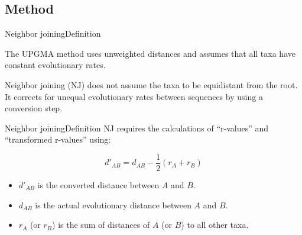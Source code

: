 \documentclass[10pt]{beamer}
\newcommand{\1}{
	\setbeamertemplate{background}{
		\texttt{[image: img/1]}
		\tikz[overlay] \fill[fill opacity=0.75,fill=white] (0,0) rectangle (-\paperwidth,\paperheight);
	}
}
\begin{document}
\subsection{Method}

\begin{frame}{Neighbor joining}{Definition}
	\begin{block}{}
		The UPGMA method uses unweighted distances and assumes that all taxa have constant evolutionary rates.
	\end{block}
	
	\begin{block}{}
		Neighbor joining (NJ) does not assume the taxa to be equidistant from the root. It corrects for unequal
		evolutionary rates between sequences by using a conversion step.
	\end{block}
\end{frame}

\begin{frame}{Neighbor joining}{Definition}
NJ requires the calculations of “r-values” and “transformed r-values” using:

\begin{equation}\label{eq:nj_1}
	d'_{AB} = d_{AB} - \frac{1}{2}(r_A + r_B)
\end{equation} 

\begin{itemize}
	\item $d'_{AB}$ is the converted distance between $A$ and $B$.
	\item $d_{AB}$ is the actual evolutionary distance between $A$ and $B$.
	\item $r_A$ (or $r_B$) is the sum of distances of $A$ (or $B$)
	to all other taxa.
\end{itemize}	
\end{frame}
\end{document}
